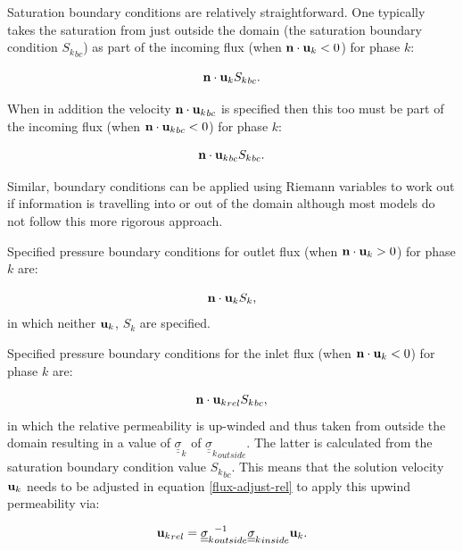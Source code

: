 Saturation boundary conditions are relatively straightforward. 
One typically takes the saturation from just outside the domain 
(the saturation boundary condition ${S_k}_{bc}$) 
as part of the incoming flux 
(when ${\bf n}\cdot {\bf u}_k<0$) for phase $k$:

\begin{equation}
{\bf n}\cdot {\bf u}_k {S_k}_{bc} .
\end{equation}

When in addition the velocity 
${\bf n}\cdot {{\bf u}_k}_{bc}$ is 
specified then this too must be part of the 
incoming flux (when ${\bf n}\cdot {{\bf u}_k}_{bc}<0$) for phase $k$:

\begin{equation}
{\bf n}\cdot {{\bf u}_k}_{bc} {S_k}_{bc} .
\end{equation}

Similar, boundary conditions can be applied using Riemann 
variables to work out if information is travelling into 
or out of the domain although most models do not follow this 
more rigorous approach. 

Specified pressure boundary conditions for outlet 
flux (when ${\bf n}\cdot {\bf u}_k>0$) for phase $k$ are:

\begin{equation}
{\bf n}\cdot {\bf u}_k {S_k},
\end{equation}
in which neither ${\bf u}_k$, ${S_k}$ are specified. 

Specified pressure boundary conditions for the inlet 
flux (when ${\bf n}\cdot {\bf u}_k<0$) for phase $k$ are:

\begin{equation}
{\bf n}\cdot {{\bf u}_k}_{rel} {S_k}_{bc},
\label{flux-adjust-rel} 
\end{equation}
in which the relative permeability is up-winded and thus taken 
from outside the domain resulting in a value of ${\underline {\underline \sigma}}_k$ of 
${{\underline {\underline \sigma}}_k}_{outside}$. The latter is calculated from 
the saturation boundary condition value ${S_k}_{bc}$. 
This means that the 
solution velocity ${{\bf u}_k}$ needs to be adjusted in 
equation \ref{flux-adjust-rel} to apply this upwind permeability 
via:

\begin{equation}
{{\bf u}_k}_{rel}={{\underline {\underline \sigma}}_k}_{outside}^{-1}{{\underline {\underline \sigma}}_k}_{inside} {{\bf u}_k}. 
\label{u-orig-interface} 
\end{equation}

